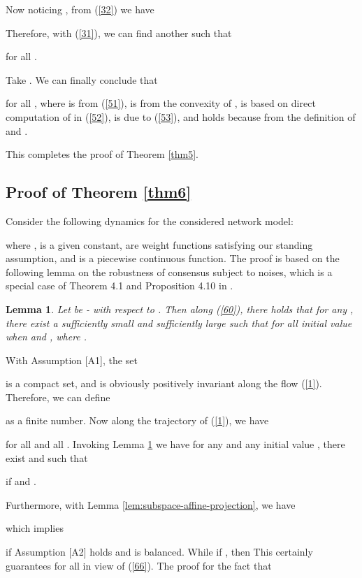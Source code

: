 \documentclass[a4paper, 11pt]{article}
\newtheorem{lemma}{Lemma}
\begin{document}
Now noticing , from (\ref{32}) we have

Therefore, with (\ref{31}), we can find another  such that

for all .

Take . We can finally conclude that

for all , where  is from (\ref{51}),  is from the convexity of ,  is based on direct computation of  in (\ref{52}),  is due to (\ref{53}), and  holds because  from the definition of  and .


 This completes the proof of Theorem \ref{thm5}.






\subsection{Proof of Theorem \ref{thm6}}

Consider the following dynamics for the considered network model:

where ,  is a given constant,  are weight functions satisfying our standing assumption, and   is a piecewise continuous  function. The proof is based on the following lemma on the robustness of  consensus subject to noises, which is a special case of Theorem 4.1 and Proposition 4.10  in \cite{shisiam}.

\begin{lemma}\label{lemrobust}
Let  be - with respect to . Then along (\ref{60}), there holds that for any ,  there exist a sufficiently small   and sufficiently large  such that  
for all initial value  when  and , where .
\end{lemma}


With Assumption [A1], the set

is a compact set, and is obviously positively invariant along the flow (\ref{1}). Therefore, we can define

as a finite number. Now along the trajectory  of (\ref{1}), we have

for all  and all . Invoking Lemma \ref{lemrobust} we have  for any  and  any initial value , there exist  and  such that
 
if  and .

Furthermore,  with Lemma \ref{lem:subspace-affine-projection}, we have

which implies

if Assumption [A2] holds and  is balanced. While  if , then 
This certainly guarantees  for all  in view of (\ref{66}). The proof for the fact that
 
\end{document}
